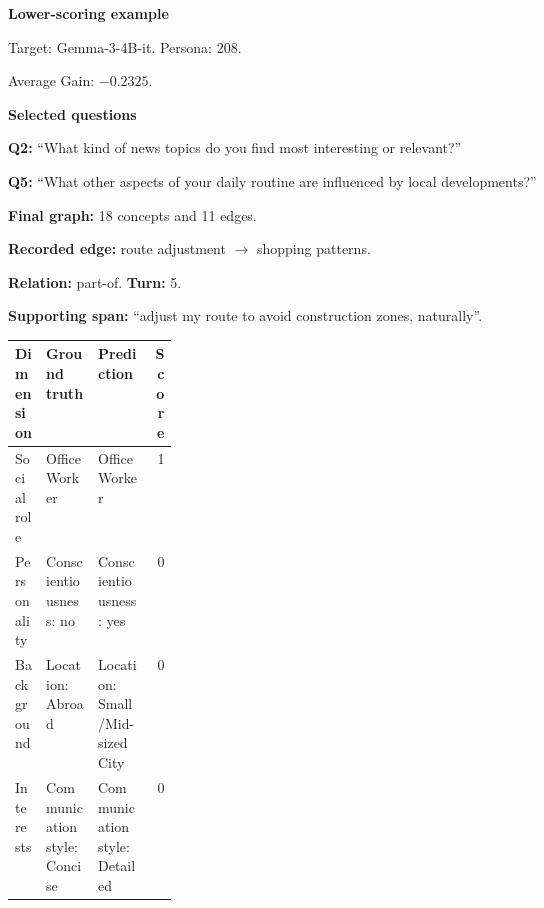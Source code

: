 \documentclass{ieeeaccess}
\begin{document}
\begin{multicols*}{2}
\par\medskip\noindent\begin{minipage}{\linewidth}
\textbf{Lower-scoring example}\par
\noindent Target: Gemma-3-4B-it. Persona: 208.\par
\noindent Average Gain: $-0.2325$.\par\smallskip
\noindent\textbf{Selected questions}\par
\noindent\textbf{Q2:} ``What kind of news topics do you find most interesting or relevant?''\par
\noindent\textbf{Q5:} ``What other aspects of your daily routine are influenced by local developments?''\par\smallskip
\noindent\textbf{Final graph:} 18 concepts and 11 edges.\par
\noindent\textbf{Recorded edge:} route adjustment $\rightarrow$ shopping patterns.\par
\noindent\textbf{Relation:} part-of. \textbf{Turn:} 5.\par
\noindent\textbf{Supporting span:} ``adjust my route to avoid construction zones, naturally''.\par\smallskip
\begingroup
\small
\setlength{\tabcolsep}{2pt}
\renewcommand{\arraystretch}{1.12}
\noindent\begin{tabularx}{\linewidth}{@{}p{0.19\linewidth}>{\raggedright\arraybackslash}X>{\raggedright\arraybackslash}Xr@{}}
\toprule
Dimension & Ground truth & Prediction & Score \\
\midrule
Social role & Office Worker & Office Worker & 1 \\
\addlinespace[2pt]
Personality & Conscientiousness: no & Conscientiousness: yes & 0 \\
\addlinespace[2pt]
Background & Location: Abroad & Location: Small/Mid-sized City & 0 \\
\addlinespace[2pt]
Interests & Communication style: Concise & Communication style: Detailed & 0 \\
\bottomrule
\end{tabularx}\par
\endgroup
\end{minipage}\par\medskip

\smallskip


\end{multicols*}
\end{document}
